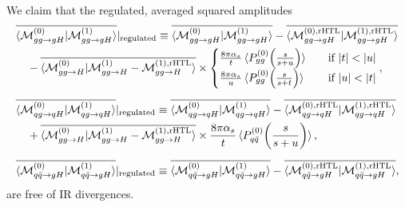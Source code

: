 We claim that the regulated, averaged squared amplitudes
\begin{equation}
\begin{split}
&\overline{\braket{\mathcal{M}^{(0)}_{gg\rightarrow gH} | \mathcal{M}^{(1)}_{gg \rightarrow gH}}} \vert_\text{regulated} \equiv  \overline{\braket{\mathcal{M}^{(0)}_{gg\rightarrow gH} | \mathcal{M}^{(1)}_{gg \rightarrow gH}}} -  \overline{\braket{\mathcal{M}^{(0), \text{rHTL}}_{gg\rightarrow gH} | \mathcal{M}^{(1), \text{rHTL}}_{gg \rightarrow gH}}} \\
& \quad - \overline{\braket{\mathcal{M}^{(0)}_{gg \rightarrow H} | \mathcal{M}^{(1)}_{gg \rightarrow H} - \mathcal{M}^{(1), \text{rHTL}}_{gg \rightarrow H}} }  \times \begin{cases} \frac{8 \pi \alpha_s}{t} \braket{P_{gg}^{(0)} \!\left(\frac{s}{s + u} \right)} \quad &\text{if } |t| < |u| \\
\frac{8 \pi \alpha_s}{u} \braket{P_{gg}^{(0)} \!\left(\frac{s}{s + t} \right)} \quad &\text{if } |u| < |t|
\end{cases}, \\[0.2cm]
& \overline{\braket{\mathcal{M}^{(0)}_{qg\rightarrow qH} | \mathcal{M}^{(1)}_{qg \rightarrow qH}}} \vert_\text{regulated} \equiv  \overline{\braket{\mathcal{M}^{(0)}_{qg\rightarrow qH} | \mathcal{M}^{(1)}_{qg \rightarrow qH}}} -  \overline{\braket{\mathcal{M}^{(0), \text{rHTL}}_{qg\rightarrow qH} | \mathcal{M}^{(1), \text{rHTL}}_{qg \rightarrow qH}}} \\
& \quad + \overline{\braket{\mathcal{M}^{(0)}_{gg \rightarrow H} | \mathcal{M}^{(1)}_{gg \rightarrow H} - \mathcal{M}^{(1), \text{rHTL}}_{gg \rightarrow H}}}  \times
\frac{8 \pi \alpha_s}{t} \braket{P_{q\bar{q}}^{(0)} \!\left(\frac{s}{s + u} \right)}, \\[0.2cm]
&\overline{\braket{\mathcal{M}^{(0)}_{q\bar{q}\rightarrow gH} | \mathcal{M}^{(1)}_{q \bar{q} \rightarrow gH}}} \vert_\text{regulated} \equiv  \overline{\braket{\mathcal{M}^{(0)}_{q \bar{q}\rightarrow gH} | \mathcal{M}^{(1)}_{q\bar{q} \rightarrow gH}}} -  \overline{\braket{\mathcal{M}^{(0), \text{rHTL}}_{q \bar{q} \rightarrow gH} | \mathcal{M}^{(1), \text{rHTL}}_{q \bar{q} \rightarrow gH}}}, \\
\end{split}
\label{eq:IR_regulation}
\end{equation}
are free of \acs{IR} divergences.

